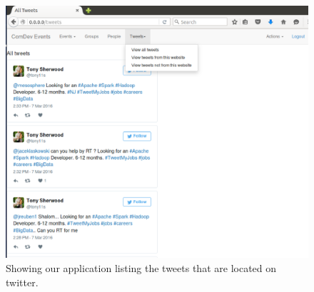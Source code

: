 \documentclass[draftclsnofoot,10pt,onecolumn]{IEEEtran} %
\begin{document}
\begin{figure}[H]
  \begin{center}
  
  \includegraphics[width=6in, frame]{listingTweets}
  \captionsetup{width=.4\linewidth}
  \centering
  \caption{Showing our application listing the tweets that are located on twitter. }

  \end{center}
\end{figure}
\end{document}
